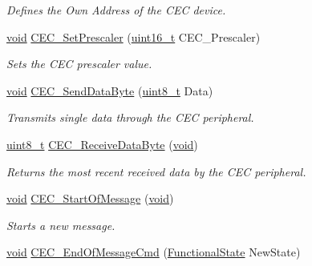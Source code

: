 \begin{DoxyCompactItemize}
\begin{DoxyCompactList}\small\item\em Defines the Own Address of the C\+EC device. \end{DoxyCompactList}\item 
\hyperlink{usb__devapi_8h_afabf60e7f57651d6d595a02c75f07cd0}{void} \hyperlink{group___c_e_c___private___functions_gad2fc626e28a82008a29f062975a9af11}{C\+E\+C\+\_\+\+Set\+Prescaler} (\hyperlink{_p_e___types_8h_a1f1825b69244eb3ad2c7165ddc99c956}{uint16\+\_\+t} C\+E\+C\+\_\+\+Prescaler)
\begin{DoxyCompactList}\small\item\em Sets the C\+EC prescaler value. \end{DoxyCompactList}\item 
\hyperlink{usb__devapi_8h_afabf60e7f57651d6d595a02c75f07cd0}{void} \hyperlink{group___c_e_c___private___functions_ga6897ab26d8f909f9160e9fac54b97441}{C\+E\+C\+\_\+\+Send\+Data\+Byte} (\hyperlink{_p_e___types_8h_aba7bc1797add20fe3efdf37ced1182c5}{uint8\+\_\+t} Data)
\begin{DoxyCompactList}\small\item\em Transmits single data through the C\+EC peripheral. \end{DoxyCompactList}\item 
\hyperlink{_p_e___types_8h_aba7bc1797add20fe3efdf37ced1182c5}{uint8\+\_\+t} \hyperlink{group___c_e_c___private___functions_ga165837bff6292e7674eff6f8b230da97}{C\+E\+C\+\_\+\+Receive\+Data\+Byte} (\hyperlink{usb__devapi_8h_afabf60e7f57651d6d595a02c75f07cd0}{void})
\begin{DoxyCompactList}\small\item\em Returns the most recent received data by the C\+EC peripheral. \end{DoxyCompactList}\item 
\hyperlink{usb__devapi_8h_afabf60e7f57651d6d595a02c75f07cd0}{void} \hyperlink{group___c_e_c___private___functions_ga71e700461ffe7820d9e1c75da65fd0fb}{C\+E\+C\+\_\+\+Start\+Of\+Message} (\hyperlink{usb__devapi_8h_afabf60e7f57651d6d595a02c75f07cd0}{void})
\begin{DoxyCompactList}\small\item\em Starts a new message. \end{DoxyCompactList}\item 
\hyperlink{usb__devapi_8h_afabf60e7f57651d6d595a02c75f07cd0}{void} \hyperlink{group___c_e_c___private___functions_ga1e2cf6e3a1ac891f2814f9d3f4043574}{C\+E\+C\+\_\+\+End\+Of\+Message\+Cmd} (\hyperlink{agilefox_2library_2inc_2stm32f10x__type_8h_ac9a7e9a35d2513ec15c3b537aaa4fba1}{Functional\+State} New\+State)

\end{DoxyCompactItemize}
